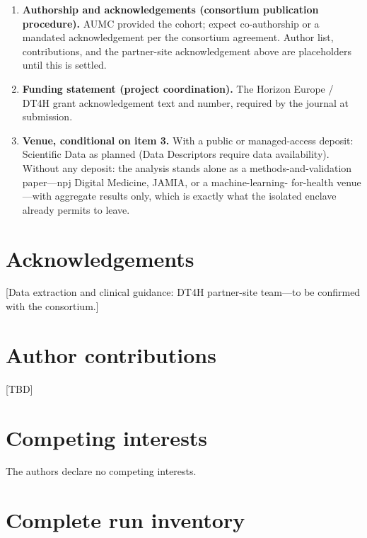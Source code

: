 \documentclass[11pt,a4paper]{article}
\begin{document}
\begin{enumerate}
datasets with their capability labels and both-policy gate reports (none
open-release-cleared; labelled as benchmark material); the re-fitted DP subset
plus the controlled-tier candidate under managed access; or the single
gate-cleared candidate (\texttt{DT4H\_Candidate\_tvae\_ind\_seed0\_postprocessed})
plus reports. The paper's claims are written to hold under any of the three.
\item \textbf{Authorship and acknowledgements (consortium publication
procedure).} AUMC provided the cohort; expect co-authorship or a mandated
acknowledgement per the consortium agreement. Author list, contributions, and the
partner-site acknowledgement above are placeholders until this is settled.
\item \textbf{Funding statement (project coordination).} The Horizon Europe /
DT4H grant acknowledgement text and number, required by the journal at
submission.
\item \textbf{Venue, conditional on item 3.} With a public or managed-access
deposit: Scientific Data as planned (Data Descriptors require data
availability). Without any deposit: the analysis stands alone as a
methods-and-validation paper---npj Digital Medicine, JAMIA, or a machine-learning-
for-health venue---with aggregate results only, which is exactly what the isolated
enclave already permits to leave.
\end{enumerate}

\section*{Acknowledgements}
[Data extraction and clinical guidance: DT4H partner-site team---to be confirmed
with the consortium.]

\section*{Author contributions}
[TBD]

\section*{Competing interests}
The authors declare no competing interests.

\appendix
\section{Complete run inventory}
\end{document}

